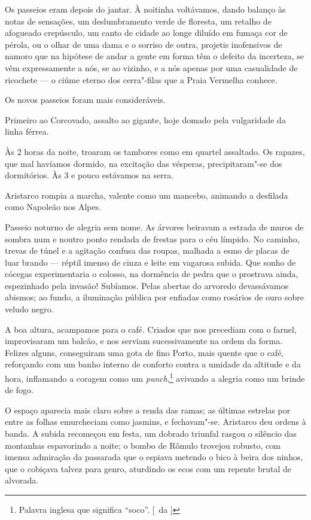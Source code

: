 Os passeios
eram depois do jantar. À noitinha voltávamos, dando balanço às notas de
sensações, um deslumbramento verde de floresta, um retalho de afogueado
crepúsculo, um canto de cidade ao longe diluído em fumaça cor de
pérola, ou o olhar de uma dama e o sorriso de outra, projetis
inofensivos de namoro que na hipótese de andar a gente em forma têm o
defeito da incerteza, se vêm expressamente a nós, se ao vizinho, e a
nós apenas por uma casualidade de ricochete --- o ciúme eterno dos
cerra"-filas que a Praia Vermelha conhece. 

Os novos passeios foram mais consideráveis. 

Primeiro ao Corcovado, assalto ao gigante, hoje
domado pela vulgaridade da linha férrea. 

Às 2 horas da noite, troaram
os tambores como em quartel assaltado. Os rapazes, que mal havíamos
dormido, na excitação das vésperas, precipitaram"-se dos dormitórios.
Às 3 e pouco estávamos na serra. 

Aristarco rompia a marcha, valente
como um mancebo, animando a desfilada como Napoleão nos Alpes. 

Passeio noturno de alegria sem nome. As árvores beiravam a estrada de muros de
sombra num e noutro ponto rendada de frestas para o céu límpido. No
caminho, trevas de túnel e a agitação confusa das roupas, malhada a
esmo de placas de luar brando --- réptil imenso de cinza e leite em
vagarosa subida. Que sonho de cócegas experimentaria o colosso, na dormência de
pedra que o prostrava ainda, espezinhado pela invasão! Subíamos. Pelas
abertas do arvoredo devassávamos abismos; ao fundo, a iluminação
pública por enfiadas como rosários de ouro sobre veludo negro. 

A boa altura, acampamos para o café. Criados que nos precediam com o farnel,
improvisaram um balcão, e nos serviam sucessivamente na ordem da forma.
Felizes alguns, conseguiram uma gota de fino Porto, mais quente que o
café, reforçando com um banho interno de conforto contra a umidade da
altitude e da hora, inflamando a coragem como um \textit{punch},\footnote{ Palavra inglesa 
que significa ``soco''. [~da ]} avivando a
alegria como um brinde de fogo. 

O espaço aparecia mais claro sobre a
renda das ramas; as últimas estrelas por entre as folhas emurcheciam
como jasmins, e fechavam"-se. Aristarco deu ordens à banda. A subida
recomeçou em festa, um dobrado triunfal rasgou o silêncio das montanhas
espavorindo a noite; o bombo de Rômulo trovejou robusto, com imensa
admiração da passarada que o espiava metendo o bico à beira dos ninhos,
que o cobiçava talvez para genro, aturdindo os ecos com um repente
brutal de alvorada. 

